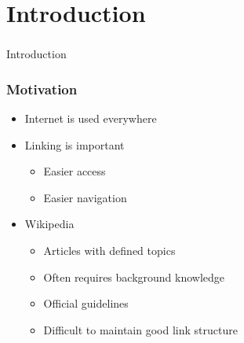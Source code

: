 \section[Introduction]{Introduction}

\begin{frame}
  \frametitle{}
  \begin{center}
    {\Huge Introduction}
  \end{center}
\end{frame}

\begin{frame}
    \frametitle{Motivation}
    \centering
    \begin{itemize}
      \item Internet is used everywhere
      \item Linking is important
        \begin{itemize}
          \item Easier access
          \item Easier navigation
        \end{itemize}
      \item Wikipedia
        \begin{itemize}
           \item Articles with defined topics
           \item Often requires background knowledge
           \item Official guidelines
           \item Difficult to maintain good link structure
         \end{itemize}
    \end{itemize}
\end{frame}

